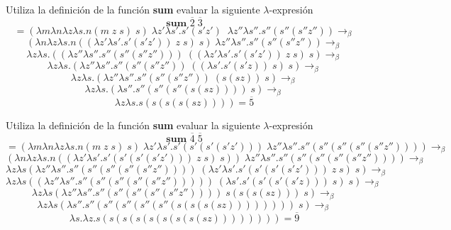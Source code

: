         \begin{exercise}
            Utiliza la definición de la función \textbf{sum} evaluar la siguiente  $\lambda$-expresión
            \[
                \textbf{sum } \overline{2} \; \overline{3} 
            \]
            \[
                = (\lambda m\lambda n\lambda z\lambda s.n(m \; z \; s) \; s) \; \lambda z'\lambda s'.s'(s'z') \;\; \lambda z''\lambda s''.s''(s''(s''z'')) \rightarrow_\beta 
            \]
            \[
                (\lambda n\lambda z\lambda s.n((\lambda z'\lambda s'.s'(s'z')) \; z \; s) \; s) \; \lambda z''\lambda s''.s''(s''(s''z'')) \rightarrow_\beta 
            \]
            \[
                \lambda z\lambda s.((\lambda z''\lambda s''.s''(s''(s''z''))) \; ((\lambda z'\lambda s'.s'(s'z')) \; z \; s) \; s) \rightarrow_\beta
            \]
            \[
                \lambda z\lambda s.(\lambda z''\lambda s''.s''(s''(s''z'')) \; ((\lambda s'.s'(s'z))  \; s) \; s) \rightarrow_\beta
            \]
            \[
                \lambda z\lambda s.(\lambda z''\lambda s''.s''(s''(s''z'')) \; (s(sz)) \; s) \rightarrow_\beta
            \]
            \[
                \lambda z\lambda s.(\lambda s''.s''(s''(s''(s(sz)))) \; s) \rightarrow_\beta
            \]
            \[
                \lambda z\lambda s.s(s(s(s(sz)))) = \overline{5}
            \]
        \end{exercise}

        \begin{exercise}
            Utiliza la definición de la función \textbf{sum} evaluar la siguiente  $\lambda$-expresión
            \[
                \textbf{sum } \overline{4} \; \overline{5} 
            \]
            \[
                = (\lambda m\lambda n\lambda z\lambda s.n(m \; z \; s) \; s) \; \lambda z'\lambda s'.s'(s'(s'(s'z'))) \; \lambda z''\lambda s''.s''(s''(s''(s''(s''z'')))) \rightarrow_\beta 
            \]
            \[
                (\lambda n\lambda z\lambda s.n((\lambda z'\lambda s'.s'(s'(s'(s'z'))) \; z \; s) \; s)) \; \lambda z''\lambda s''.s''(s''(s''(s''(s''z'')))) \rightarrow_\beta 
            \]
            \[
                \lambda z\lambda s(\lambda z''\lambda s''.s''(s''(s''(s''(s''z'')))) \; (\lambda z'\lambda s'.s'(s'(s'(s'z'))) \; z \; s) \; s) \rightarrow_\beta
            \]
            \[
                \lambda z\lambda s((\lambda z''\lambda s''.s''(s''(s''(s''(s''z''))))) \; (\lambda s'.s'(s'(s'(s'z)))  \; s) \; s) \rightarrow_\beta
            \]
            \[
                \lambda z\lambda s(\lambda z''\lambda s''.s''(s''(s''(s''(s''z'')))) \; s(s(s(sz))) \; s) \rightarrow_\beta
            \]
            \[
                \lambda z\lambda s(\lambda s''.s''(s''(s''(s''(s''(s(s(s(sz)))))))) \; s) \rightarrow_\beta
            \]
            \[
                \lambda s.\lambda z .s(s(s(s(s(s(s(s(sz)))))))) = \overline{9}
            \]
        \end{exercise}

